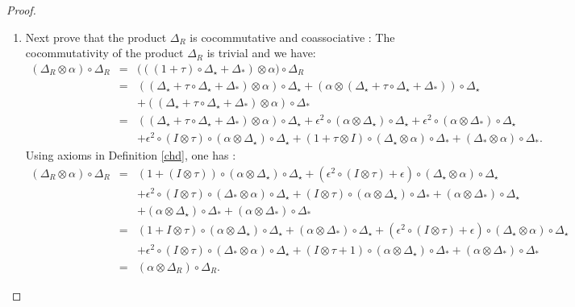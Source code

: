 \documentclass{article}
\theoremstyle{definition}
\theoremstyle{remark}
\numberwithin{equation}{section}
\begin{document}
\begin{proof}
\begin{enumerate}
\item Next prove that the product $\Delta_R$ is cocommutative and coassociative :
The cocommutativity of the product $\Delta_R$ is trivial and we have:
 \begin{eqnarray}
(\Delta_R\otimes\alpha)\circ\Delta_R
&=&\Big(((1+\tau)\circ\Delta_\star+\Delta_\ast)\otimes\alpha\Big)\circ\Delta_R\nonumber\\
&=&((\Delta_\star+\tau\circ\Delta_\star+\Delta_\ast)\otimes\alpha)\circ\Delta_\star+(\alpha\otimes(\Delta_\star+\tau\circ\Delta_\star+\Delta_\ast))\circ\Delta_\star\nonumber\\
&&+ ((\Delta_\star+\tau\circ\Delta_\star+\Delta_\ast)\otimes\alpha)\circ\Delta_\ast\nonumber\\
&=&((\Delta_\star+\tau\circ\Delta_\star+\Delta_\ast)\otimes\alpha)\circ\Delta_\star+\epsilon^2\circ(\alpha\otimes\Delta_\star)\circ\Delta_\star+\epsilon^2\circ(\alpha\otimes\Delta_\ast)\circ\Delta_\star\nonumber\\
&&+\epsilon^2\circ(I\otimes\tau)\circ(\alpha\otimes\Delta_\star)\circ\Delta_\star+(1+\tau\otimes I)\circ(\Delta_\star\otimes\alpha)\circ\Delta_\ast+(\Delta_\ast\otimes\alpha)\circ\Delta_\ast\nonumber.
 \end{eqnarray}
Using axioms in Definition \ref{chd}, one has :
\begin{eqnarray}
 (\Delta_R\otimes\alpha)\circ\Delta_R
&=&(1+(I\otimes\tau))\circ(\alpha\otimes\Delta_\star)\circ\Delta_\star+(\epsilon^2\circ(I\otimes\tau)+\epsilon)\circ(\Delta_\star\otimes\alpha)\circ\Delta_\star\nonumber\\
&&+\epsilon^2\circ(I\otimes\tau)\circ(\Delta_\ast\otimes\alpha)\circ\Delta_\star+(I\otimes\tau)\circ(\alpha\otimes\Delta_\star)\circ\Delta_\ast+(\alpha\otimes\Delta_\ast)\circ\Delta_\star\nonumber\\
&&+(\alpha\otimes\Delta_\star)\circ\Delta_\ast+(\alpha\otimes\Delta_\ast)\circ\Delta_\ast\nonumber\\
&=&(1+I\otimes\tau)\circ(\alpha\otimes\Delta_\star)\circ\Delta_\star+(\alpha\otimes\Delta_\ast)\circ\Delta_\star+(\epsilon^2\circ(I\otimes\tau)+\epsilon)\circ(\Delta_\star\otimes\alpha)\circ\Delta_\star\nonumber\\
&&+\epsilon^2\circ(I\otimes\tau)\circ(\Delta_\ast\otimes\alpha)\circ\Delta_\star+(I\otimes\tau+1)\circ(\alpha\otimes\Delta_\star)\circ\Delta_\ast+(\alpha\otimes\Delta_\ast)\circ\Delta_\ast\nonumber\\
&=&(\alpha\otimes\Delta_R)\circ\Delta_R.\nonumber
\end{eqnarray}

\end{enumerate}
\end{proof}
\end{document}
